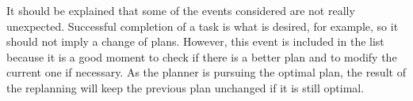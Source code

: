 It should be explained that some of the events considered are not really unexpected. Successful completion of a task is what is desired, for example, so it should not imply a change of plans. However, this event is included in the list because it is a good moment to check if there is a better plan and to modify the current one if necessary. As the planner is pursuing the optimal plan, the result of the replanning will keep the previous plan unchanged if it is still optimal.